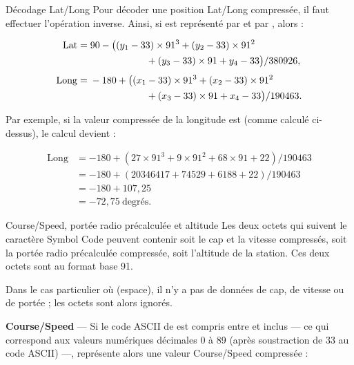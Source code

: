 \begin{aprssideblock}{Décodage Lat/Long}
Pour décoder une position Lat/Long compressée, il faut effectuer l'opération
inverse. Ainsi, si  est représenté par
 et  par
, alors :

\begin{align*}
\mathrm{Lat}={}&90-\bigl((y_1-33)\times91^3+(y_2-33)\times91^2 \\
&\hspace{5.8em}+(y_3-33)\times91+y_4-33\bigr)/380926, \\[0.4em]
\mathrm{Long}={}&-180+\bigl((x_1-33)\times91^3+(x_2-33)\times91^2 \\
&\hspace{5.8em}+(x_3-33)\times91+x_4-33\bigr)/190463.
\end{align*}

Par exemple, si la valeur compressée de la longitude est 
(comme calculé ci-dessus), le calcul devient :

\begin{align*}
\mathrm{Long}
 &= -180+(27\times91^3+9\times91^2+68\times91+22)/190463 \\
 &= -180+(20346417+74529+6188+22)/190463 \\
 &= -180+107{,}25 \\
 &= -72{,}75\ \text{degrés}.
\end{align*}
\end{aprssideblock}

\begin{aprssideblock}{Course/Speed, portée radio précalculée et altitude}
Les deux octets  qui suivent le caractère Symbol Code peuvent
contenir soit le cap et la vitesse compressés, soit la portée radio
précalculée compressée, soit l'altitude de la station. Ces deux octets sont au
format base 91.

Dans le cas particulier où \lit{~} (espace), il n'y a pas
de données de cap, de vitesse ou de portée ; les octets 
sont alors ignorés.

\textbf{Course/Speed} --- Si le code ASCII de  est compris entre
\lit{!} et  inclus --- ce qui correspond aux valeurs numériques
décimales 0 à 89 (après soustraction de 33 au code ASCII) ---,
 représente alors une valeur Course/Speed compressée :
\end{aprssideblock}

